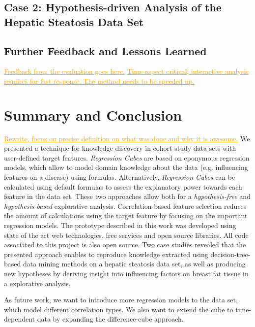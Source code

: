 \documentclass[journal]{style/vgtc} 			          %
\newcommand{\com}[1]{\textcolor{orange}{\uline{#1}}}
\begin{document}
\subsection{Case 2: Hypothesis-driven Analysis of the Hepatic Steatosis Data Set}
\subsection{Further Feedback and Lessons Learned} \label{Lessons Learned}
\com{Feedback from the evaluation goes here.}
\com{Time-aspect critical, interactive analysis requires for fast response. The method needs to be speeded up.}

\section{Summary and Conclusion}
\com{Rewrite, focus on precise definition on what was done and why it is awesome.}
We presented a technique for knowledge discovery in cohort study data sets with user-defined target features.
\emph{Regression Cubes} are based on eponymous regression models, which allow to model domain knowledge about the data (e.g. influencing features on a disease) using formulas.
Alternatively, \emph{Regression Cubes} can be calculated using default formulas to assess the explanatory power towards each feature in the data set.
These two approaches allow both for a \emph{hypothesis-free} and \emph{hypothesis-based} explorative analysis.
Correlation-based feature selection reduces the amount of calculations using the target feature by focusing on the important regression models.
The prototype described in this work was developed using state of the art web technologies, free services and open source libraries.
All code associated to this project is also open source.
Two case studies revealed that the presented approach enables to reproduce knowledge extracted using decision-tree-based data mining methods on a hepatic steatosis data set, as well as producing new hypotheses by deriving insight into influencing factors on breast fat tissue in a explorative analysis.

As future work, we want to introduce more regression models to the data set, which model different correlation types.
We also want to extend the cube to time-dependent data by expanding the difference-cube approach.
\end{document}
